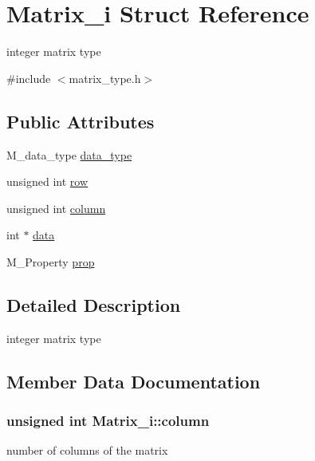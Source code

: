 \hypertarget{structMatrix__i}{}\section{Matrix\+\_\+i Struct Reference}
\label{structMatrix__i}


integer matrix type  




{\ttfamily \#include $<$matrix\+\_\+type.\+h$>$}

\subsection*{Public Attributes}
\begin{DoxyCompactItemize}
\item 
M\+\_\+data\+\_\+type \hyperlink{structMatrix__i_a099b6cf6ea02b60b50fafa042e48c063}{data\+\_\+type}
\item 
unsigned int \hyperlink{structMatrix__i_a9fc27d070aaebd0e2d7198a62f7b25d6}{row}
\item 
unsigned int \hyperlink{structMatrix__i_ae8f97821a7cb3ea2c6b4daa452f65c02}{column}
\item 
int $\ast$ \hyperlink{structMatrix__i_a0fe0365ed38d16792c645305c5662f53}{data}
\item 
M\+\_\+\+Property \hyperlink{structMatrix__i_a8b30ae67887da20fe1d7fdd51ebc3ecb}{prop}
\end{DoxyCompactItemize}


\subsection{Detailed Description}
integer matrix type 

\subsection{Member Data Documentation}
\subsubsection[{\texorpdfstring{column}{column}}]{\setlength{\rightskip}{0pt plus 5cm}unsigned int Matrix\+\_\+i\+::column}\hypertarget{structMatrix__i_ae8f97821a7cb3ea2c6b4daa452f65c02}{}\label{structMatrix__i_ae8f97821a7cb3ea2c6b4daa452f65c02}
number of columns of the matrix 
